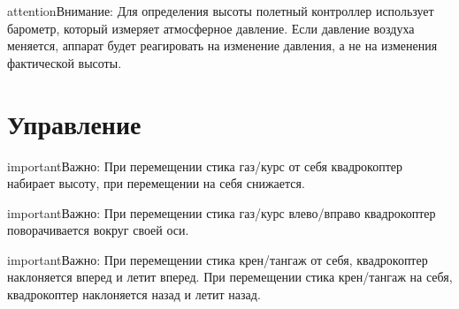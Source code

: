 \documentclass[a4paper,10pt,russian]{sphinxmanual}
\begin{document}
\begin{sphinxadmonition}{attention}{Внимание:}
Для определения высоты полетный контроллер использует барометр, который измеряет атмосферное давление. Если давление воздуха меняется, аппарат будет реагировать на изменение давления, а не на изменения фактической высоты.
\end{sphinxadmonition}


\section{Управление}
\label{\detokenize{flight/rc_control:id1}}\label{\detokenize{flight/rc_control::doc}}




\begin{sphinxadmonition}{important}{Важно:}
При перемещении стика газ/курс от себя квадрокоптер набирает высоту, при перемещении на себя \textendash{} снижается.
\end{sphinxadmonition}



\begin{sphinxadmonition}{important}{Важно:}
При перемещении стика газ/курс влево/вправо квадрокоптер поворачивается вокруг своей оси.
\end{sphinxadmonition}



\begin{sphinxadmonition}{important}{Важно:}
При перемещении стика крен/тангаж от себя, квадрокоптер наклоняется вперед и летит вперед. При перемещении стика крен/тангаж на себя, квадрокоптер наклоняется назад и летит назад.
\end{sphinxadmonition}
\end{document}
